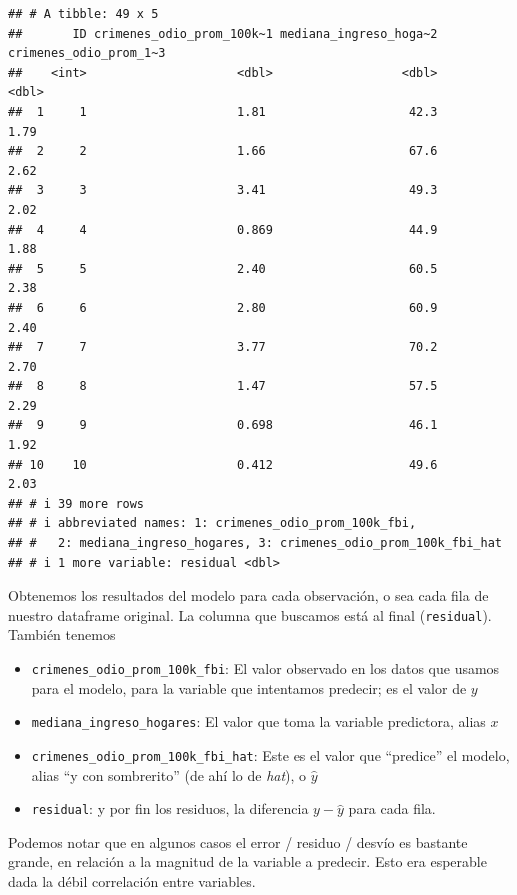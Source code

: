 \documentclass[
]{book}
\providecommand{\tightlist}{%
  \setlength{\itemsep}{0pt}\setlength{\parskip}{0pt}}
\begin{document}
\begin{verbatim}
## # A tibble: 49 x 5
##       ID crimenes_odio_prom_100k~1 mediana_ingreso_hoga~2 crimenes_odio_prom_1~3
##    <int>                     <dbl>                  <dbl>                  <dbl>
##  1     1                     1.81                    42.3                   1.79
##  2     2                     1.66                    67.6                   2.62
##  3     3                     3.41                    49.3                   2.02
##  4     4                     0.869                   44.9                   1.88
##  5     5                     2.40                    60.5                   2.38
##  6     6                     2.80                    60.9                   2.40
##  7     7                     3.77                    70.2                   2.70
##  8     8                     1.47                    57.5                   2.29
##  9     9                     0.698                   46.1                   1.92
## 10    10                     0.412                   49.6                   2.03
## # i 39 more rows
## # i abbreviated names: 1: crimenes_odio_prom_100k_fbi,
## #   2: mediana_ingreso_hogares, 3: crimenes_odio_prom_100k_fbi_hat
## # i 1 more variable: residual <dbl>
\end{verbatim}

Obtenemos los resultados del modelo para cada observación, o sea cada fila de nuestro dataframe original. La columna que buscamos está al final (\texttt{residual}). También tenemos

\begin{itemize}
\tightlist
\item
  \texttt{crimenes\_odio\_prom\_100k\_fbi}: El valor observado en los datos que usamos para el modelo, para la variable que intentamos predecir; es el valor de \(y\)
\item
  \texttt{mediana\_ingreso\_hogares}: El valor que toma la variable predictora, alias \(x\)
\item
  \texttt{crimenes\_odio\_prom\_100k\_fbi\_hat}: Este es el valor que ``predice'' el modelo, alias ``y con sombrerito'' (de ahí lo de \emph{hat}), o \(\hat{y}\)
\item
  \texttt{residual}: y por fin los residuos, la diferencia \(y - \hat{y}\) para cada fila.
\end{itemize}

Podemos notar que en algunos casos el error / residuo / desvío es bastante grande, en relación a la magnitud de la variable a predecir. Esto era esperable dada la débil correlación entre variables.
\end{document}
